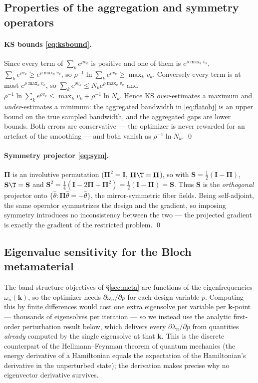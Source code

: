 \documentclass[11pt]{article}
\begin{document}
\subsection{Properties of the aggregation and symmetry operators}
\label{app:opprops}
\paragraph{KS bounds \eqref{eq:ksbound}.} Since every term of
$\sum_k e^{\rho v_k}$ is positive and one of them is $e^{\rho\max_k v_k}$,
$\sum_k e^{\rho v_k}\ge e^{\rho\max_k v_k}$, so
$\rho^{-1}\ln\sum_k e^{\rho v_k}\ge\max_k v_k$. Conversely every term is at most
$e^{\rho\max_k v_k}$, so $\sum_k e^{\rho v_k}\le N_ke^{\rho\max_k v_k}$ and
$\rho^{-1}\ln\sum_k e^{\rho v_k}\le\max_k v_k+\rho^{-1}\ln N_k$. Hence KS
\emph{over}-estimates a maximum and \emph{under}-estimates a minimum: the
aggregated bandwidth in \eqref{eq:flatobj} is an upper bound on the true sampled
bandwidth, and the aggregated gaps are lower bounds. Both errors are conservative
--- the optimizer is never rewarded for an artefact of the smoothing --- and both
vanish as $\rho^{-1}\ln N_k$. \qed

\paragraph{Symmetry projector \eqref{eq:sym}.} $\bm\Pi$ is an involutive
permutation ($\bm\Pi^2=\mathbf I$, $\bm\Pi\T=\bm\Pi$), so with
$\mathbf S=\tfrac12(\mathbf I-\bm\Pi)$,
$\mathbf S\T=\mathbf S$ and
$\mathbf S^2=\tfrac14(\mathbf I-2\bm\Pi+\bm\Pi^2)=\tfrac12(\mathbf I-\bm\Pi)
=\mathbf S$. Thus $\mathbf S$ is the \emph{orthogonal} projector onto
$\{\hat\theta:\bm\Pi\hat\theta=-\hat\theta\}$, the mirror-symmetric fiber fields.
Being self-adjoint, the same operator symmetrizes the design and the gradient, so
imposing symmetry introduces no inconsistency between the two --- the projected
gradient is exactly the gradient of the restricted problem. \qed

\subsection{Eigenvalue sensitivity for the Bloch metamaterial}
\label{sec:app:hf}
The band-structure objectives of \S\ref{sec:meta} are functions of the
eigenfrequencies $\omega_n(\mathbf k)$, so the optimizer needs
$\partial\omega_n/\partial p$ for each design variable $p$. Computing this by
finite differences would cost one extra eigensolve per variable per
$\mathbf k$-point --- thousands of eigensolves per iteration --- so we instead
use the analytic first-order perturbation result below, which delivers every
$\partial\lambda_n/\partial p$ from quantities \emph{already} computed by the
single eigensolve at that $\mathbf k$. This is the discrete counterpart of the
Hellmann--Feynman theorem of quantum mechanics (the energy derivative of a
Hamiltonian equals the expectation of the Hamiltonian's derivative in the
unperturbed state); the derivation makes precise why no eigenvector derivative
survives.
\end{document}
